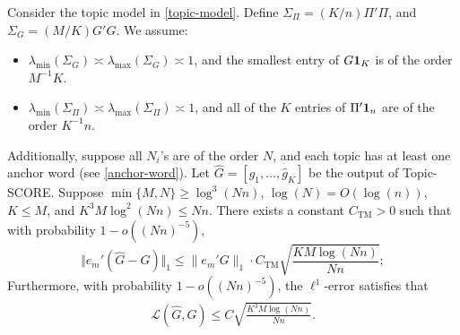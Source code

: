 \documentclass[preprint,11pt]{article}
\numberwithin{equation}{section}
\begin{document}
\begin{thm}\label{thm:TM_errorbound}
    Consider the topic model in \eqref{topic-model}. Define $\Sigma_\Pi = (K/n)\Pi'\Pi$, and $\Sigma_G = (M/K)G'G$. %
    We assume:
    \begin{itemize}
        \item[(i')]  $\lambda_{\min}(\Sigma_G)\asymp \lambda_{\max}(\Sigma_G)\asymp 1$, and the smallest entry of $G{\bf 1}_K$ is of the order $M^{-1}K$. 
        \item[(ii')] $\lambda_{\min}(\Sigma_\Pi)\asymp \lambda_{\max}(\Sigma_\Pi)\asymp 1$, and all of the $K$ entries of $\Pi'{\bf 1}_n$ are of the order $K^{-1}n$. 
    \end{itemize}
    Additionally, suppose all $N_i$'s are of the order $N$, and each topic has at least one anchor word (see \eqref{anchor-word}). 
    Let $\widehat{G}=[\hat{g}_1, \ldots, \hat{g}_K]$ be the output of Topic-SCORE. 
    Suppose $\min\{M,N\}\ge \log^3(Nn)$, $\log(N)=O(\log(n))$, $K\le M$, and $K^3M\log^2(Nn)\leq  Nn$. 
There exists a constant $C_{\text{TM}}>0$ such that with probability $1- o((Nn)^{-5})$, 
\[
\Vert e_m'(\widehat{G} - G)\Vert_1 \leq \|e_m'G\|_1\cdot C_{\text{TM}} \sqrt{\frac{KM\log (Nn)}{Nn}};
\]
Furthermore, with probability $1-o((Nn)^{-5})$, the $\ell^1$-error satisfies that 
\begin{align}\label{tscore-op-norm}
\mathcal L (\widehat G, G)  
\leq C  \sqrt{\frac{K^3 M\log (Nn)}{Nn}}.
\end{align}
\end{thm}



\end{document}
